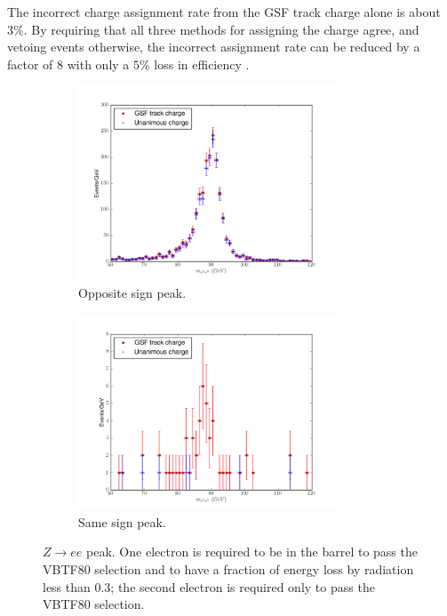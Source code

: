 The incorrect charge assignment rate from the GSF track charge alone is about
$3\%$.  By requiring that all three methods for assigning the charge agree, and
vetoing events otherwise, the incorrect assignment rate can be reduced by a
factor of 8 with only a $5\%$ loss in efficiency \cite{baisini2010electron}.

\begin{figure}[htbp]
  \centering
  \begin{subfigure}{\textwidth}
    \centering
    \includegraphics[width=0.85\textwidth]{zpeak_os}
    \caption{Opposite sign \PZ peak.}
    \label{fig:zpeak_os}
  \end{subfigure}
  \begin{subfigure}{\textwidth}
    \centering
    \includegraphics[width=0.85\textwidth]{zpeak_ss}
    \caption{Same sign \PZ peak.}
    \label{fig:zpeak_ss}
  \end{subfigure}
  \caption[$Z\rightarrow ee$ peak.]{ $Z\rightarrow ee$ peak. One electron is required to be in the
barrel to pass the VBTF80 selection and to have a fraction of energy loss by
radiation less than 0.3; the second electron is required only to pass the VBTF80
selection\cite{baisini2010electron}.}\label{fig:zpeak} 
\end{figure}

